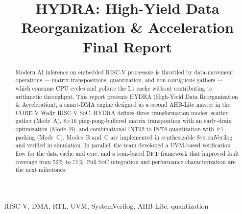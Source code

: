 \documentclass[conference]{IEEEtran}
\begin{document}
\title{
    HYDRA: High-Yield Data Reorganization \& Acceleration\\
    \large Final Report \\
}
\author{
}
\maketitle
\begin{abstract}
    Modern AI inference on embedded RISC-V processors is throttled by 
    data-movement operations --- matrix transpositions, quantization, and 
    non-contiguous gathers --- which consume CPU cycles and pollute the L1 
    cache without contributing to arithmetic throughput. This report 
    presents HYDRA (High-Yield Data Reorganization \& Acceleration), a 
    smart-DMA engine designed as a second AHB-Lite master in the CORE-V 
    Wally RISC-V SoC. HYDRA defines three transformation modes: 
    scatter-gather (Mode~A), 8$\times$16 ping-pong-buffered matrix 
    transposition with an early-drain optimization (Mode~B), and 
    combinational INT32-to-INT8 quantization with 4:1 packing (Mode~C). 
    Modes~B and~C are implemented in synthesizable SystemVerilog and 
    verified in simulation. In parallel, the team developed a UVM-based 
    verification flow for the data cache and core, and a scan-based DFT 
    framework that improved fault coverage from 52\% to 71\%. Full SoC 
    integration and performance characterization are the next milestones.
\end{abstract}
\begin{IEEEkeywords}
    RISC-V, DMA, RTL, UVM, SystemVerilog, AHB-Lite, quantization
\end{IEEEkeywords}
\end{document}
